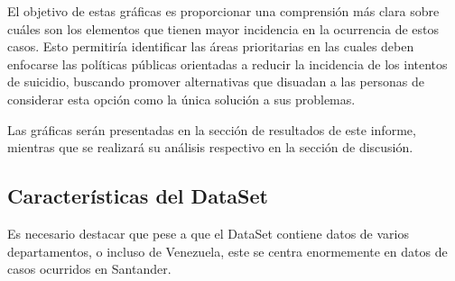 \documentclass[
]{article}
\newenvironment{Shaded}{\begin{snugshade}}{\end{snugshade}}
\newcommand{\AttributeTok}[1]{\textcolor[rgb]{0.13,0.29,0.53}{#1}}
\newcommand{\ConstantTok}[1]{\textcolor[rgb]{0.56,0.35,0.01}{#1}}
\newcommand{\DecValTok}[1]{\textcolor[rgb]{0.00,0.00,0.81}{#1}}
\newcommand{\FunctionTok}[1]{\textcolor[rgb]{0.13,0.29,0.53}{\textbf{#1}}}
\newcommand{\NormalTok}[1]{#1}
\newcommand{\OtherTok}[1]{\textcolor[rgb]{0.56,0.35,0.01}{#1}}
\newcommand{\SpecialCharTok}[1]{\textcolor[rgb]{0.81,0.36,0.00}{\textbf{#1}}}
\newcommand{\StringTok}[1]{\textcolor[rgb]{0.31,0.60,0.02}{#1}}
\begin{document}
El objetivo de estas gráficas es proporcionar una comprensión más clara
sobre cuáles son los elementos que tienen mayor incidencia en la
ocurrencia de estos casos. Esto permitiría identificar las áreas
prioritarias en las cuales deben enfocarse las políticas públicas
orientadas a reducir la incidencia de los intentos de suicidio, buscando
promover alternativas que disuadan a las personas de considerar esta
opción como la única solución a sus problemas.

Las gráficas serán presentadas en la sección de resultados de este
informe, mientras que se realizará su análisis respectivo en la sección
de discusión.

\subsection{Características del
DataSet}\label{caracteruxedsticas-del-dataset}

Es necesario destacar que pese a que el DataSet contiene datos de varios
departamentos, o incluso de Venezuela, este se centra enormemente en
datos de casos ocurridos en Santander.

\begin{Shaded}
\end{Shaded}
\end{document}
